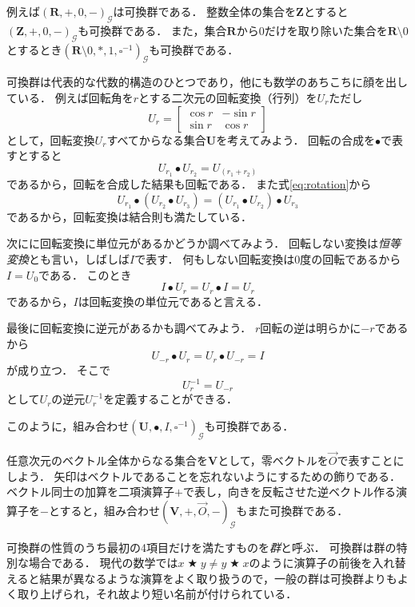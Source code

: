 \documentclass[twocolumn]{jsbook}
\DeclareMathOperator{\mathAnyBinaryOperator}{\bigstar}
\newcommand{\mathSomething}{\square}
\newcommand{\mathSet}[1]{\mathbf{#1}}
\newcommand{\mathVector}[1]{\vec{#1}}
\newcommand{\mathGroup}[4]{(#1,#2,#3,#4)_\mathcal{G}}
\newcommand{\keyword}[1]{\emph{#1}}
\begin{document}
例えば$\mathGroup{\mathSet{R}}{+}{0}{-}$は可換群である．
整数全体の集合を$\mathSet{Z}$とすると$\mathGroup{\mathSet{Z}}{+}{0}{-}$も可換群である．
また，集合$\mathSet{R}$から$0$だけを取り除いた集合を$\mathSet{R}\setminus0$とするとき$\mathGroup{\mathSet{R}\setminus0}{*}{1}{\mathSomething^{-1}}$も可換群である．

可換群は代表的な代数的構造のひとつであり，他にも数学のあちこちに顔を出している．
例えば回転角を$r$とする二次元の回転変換（行列）を$U_r$ただし$$U_r=\begin{bmatrix}\cos r&-\sin r\\\sin r&\cos r\end{bmatrix}$$として，回転変換$U_r$すべてからなる集合$\mathSet{U}$を考えてみよう．
回転の合成を$\bullet$で表すとすると
\begin{equation}
\label{eq:rotation}
U_{r_1}\bullet U_{r_2}=U_{(r_1+r_2)}
\end{equation}
であるから，回転を合成した結果も回転である．
また式\eqref{eq:rotation}から$$U_{r_1}\bullet\left(U_{r_2}\bullet U_{r_3}\right)=\left(U_{r_1}\bullet U_{r_2}\right)\bullet U_{r_3}$$
であるから，回転変換は結合則も満たしている．

次にに回転変換に単位元があるかどうか調べてみよう．
回転しない変換は\keyword{恒等変換}とも言い，しばしば$I$で表す．
何もしない回転変換は$0$度の回転であるから$I=U_0$である．
このとき$$I\bullet U_r=U_r\bullet I=U_r$$であるから，$I$は回転変換の単位元であると言える．

最後に回転変換に逆元があるかも調べてみよう．
$r$回転の逆は明らかに$-r$であるから$$U_{-r}\bullet U_r=U_r\bullet U_{-r}=I$$が成り立つ．
そこで$$U_{r}^{-1}=U_{-r}$$として$U_r$の逆元$U_r^{-1}$を定義することができる．

このように，組み合わせ$\mathGroup{\mathSet{U}}{\bullet}{I}{\mathSomething^{-1}}$も可換群である．

任意次元のベクトル全体からなる集合を$\mathSet{V}$として，零ベクトルを$\mathVector{O}$で表すことにしよう．
矢印はベクトルであることを忘れないようにするための飾りである．
ベクトル同士の加算を二項演算子$+$で表し，向きを反転させた逆ベクトル作る演算子を$-$とすると，組み合わせ$\mathGroup{\mathSet{V}}{+}{\mathVector{O}}{-}$もまた可換群である．

可換群の性質のうち最初の4項目だけを満たすものを\keyword{群}と呼ぶ．
可換群は群の特別な場合である．
現代の数学では$x\mathAnyBinaryOperator y\neq y\mathAnyBinaryOperator x$のように演算子の前後を入れ替えると結果が異なるような演算をよく取り扱うので，一般の群は可換群よりもよく取り上げられ，それ故より短い名前が付けられている．
\end{document}
